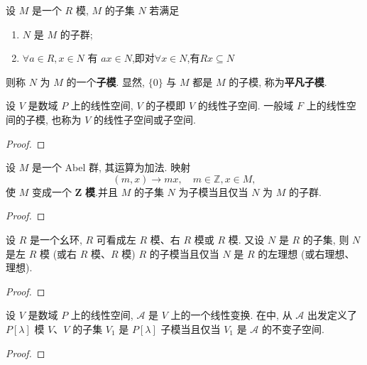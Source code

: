 \documentclass[../../main.tex]{subfiles}%
\begin{document}
\begin{definition}
设 \( M \) 是一个 \( R \) 模, \( M \) 的子集 \( N \) 若满足
\begin{enumerate}[(1)]
\item \( N \) 是 \( M \) 的子群;
\item \( \forall a \in R, x \in N \) 有 \( ax \in N \),即对$\forall x\in N$,有$Rx\subseteq N$
\end{enumerate}
则称 \( N \) 为 \( M \) 的一个\textbf{子模}.
显然, \( \{0\} \) 与 \( M \) 都是 \( M \) 的子模, 称为\textbf{平凡子模}.
\end{definition}

\begin{example}
设 \( V \) 是数域 \( P \) 上的线性空间, \( V \) 的子模即 \( V \) 的线性子空间. 一般域 \( F \) 上的线性空间的子模, 也称为 \( V \) 的线性子空间或子空间.
\end{example}
\begin{proof}



\end{proof}

\begin{example}
设 \( M \) 是一个 Abel 群, 其运算为加法. 映射
\[
(m,x) \to mx, \quad m \in \mathbb{Z}, x \in M,
\]
使 \( M \) 变成一个 \( \boldsymbol{Z} \) \textbf{模}.并且 \( M \) 的子集 \( N \) 为子模当且仅当 \( N \) 为 \( M \) 的子群.
\end{example}
\begin{proof}



\end{proof}

\begin{proposition}
设 \( R \) 是一个幺环, \( R \) 可看成左 \( R \) 模、右 \( R \) 模或 \( R \) 模. 又设 \( N \) 是 \( R \) 的子集, 则 \( N \) 是左 \( R \) 模 (或右 \( R \) 模、\( R \) 模) \( R \) 的子模当且仅当 \( N \) 是 \( R \) 的左理想 (或右理想、理想).
\end{proposition}
\begin{proof}



\end{proof}

\begin{example}
设 \( V \) 是数域 \( P \) 上的线性空间, \( \mathcal{A} \) 是 \( V \) 上的一个线性变换. 在中, 从 \( \mathcal{A} \) 出发定义了 \( P[\lambda] \) 模 \( V \)、\( V \) 的子集 \( V_1 \) 是 \( P[\lambda] \) 子模当且仅当 \( V_1 \) 是 \( \mathcal{A} \) 的不变子空间.
\end{example}
\begin{proof}



\end{proof}
\end{document}
